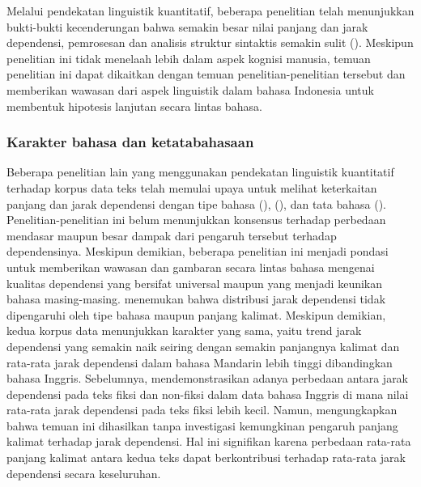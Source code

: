 Melalui pendekatan linguistik kuantitatif, beberapa penelitian telah menunjukkan bukti-bukti kecenderungan bahwa semakin besar nilai panjang dan jarak dependensi, pemrosesan dan analisis struktur sintaktis semakin sulit (\citealp{gibson1998linguistic, hiranuma1999syntactic, jiang2015effects, temperley2007minimization}). Meskipun penelitian ini tidak menelaah lebih dalam aspek kognisi manusia, temuan penelitian ini dapat dikaitkan dengan temuan penelitian-penelitian tersebut dan memberikan wawasan dari aspek linguistik dalam bahasa Indonesia untuk membentuk hipotesis lanjutan secara lintas bahasa.

\subsubsection{Karakter bahasa dan ketatabahasaan}
Beberapa penelitian lain yang menggunakan pendekatan linguistik kuantitatif terhadap korpus data teks telah memulai upaya untuk melihat keterkaitan panjang dan jarak dependensi dengan tipe bahasa (\citealp{hiranuma1999syntactic, eppler2005syntax, liu2012quantitative}), (\citealp{oya2011syntactic, ferrer2014risks, jiang2015effects}), dan tata bahasa (\citealp{liu2008dependency, gildea2010grammars}). Penelitian-penelitian ini belum menunjukkan konsensus terhadap perbedaan mendasar maupun besar dampak dari pengaruh tersebut terhadap dependensinya. Meskipun demikian, beberapa penelitian ini menjadi pondasi untuk memberikan wawasan dan gambaran secara lintas bahasa mengenai kualitas dependensi yang bersifat universal maupun yang menjadi keunikan bahasa masing-masing. \cite{jiang2015effects} menemukan bahwa distribusi jarak dependensi tidak dipengaruhi oleh tipe bahasa maupun panjang kalimat. Meskipun demikian, kedua korpus data menunjukkan karakter yang sama, yaitu trend jarak dependensi yang semakin naik seiring dengan semakin panjangnya kalimat dan rata-rata jarak dependensi dalam bahasa Mandarin lebih tinggi dibandingkan bahasa Inggris. Sebelumnya, \cite{oya2013degree} mendemonstrasikan adanya perbedaan antara jarak dependensi pada teks fiksi dan non-fiksi dalam data bahasa Inggris di mana nilai rata-rata jarak dependensi pada teks fiksi lebih kecil. Namun, \cite{wang2017effects} mengungkapkan bahwa temuan ini dihasilkan tanpa investigasi kemungkinan pengaruh panjang kalimat terhadap jarak dependensi. Hal ini signifikan karena perbedaan rata-rata panjang kalimat antara kedua teks dapat berkontribusi terhadap rata-rata jarak dependensi secara keseluruhan.

